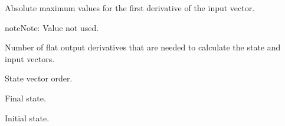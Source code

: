 \documentclass[letterpaper,10pt,english]{sphinxmanual}
\begin{document}
\begin{fulllineitems}

\begin{fulllineitems}
\label{Multi-robot motion planner:planning_sim.UnicycleKineModel.acc_max}
Absolute maximum values for the first derivative of the input vector.

\begin{notice}{note}{Note:}
Value not used.
\end{notice}

\end{fulllineitems}


\begin{fulllineitems}
\label{Multi-robot motion planner:planning_sim.UnicycleKineModel.l}
Number of flat output derivatives that are needed to calculate the state
and input vectors.

\end{fulllineitems}


\begin{fulllineitems}
\label{Multi-robot motion planner:planning_sim.UnicycleKineModel.q_dim}
State vector order.

\end{fulllineitems}


\begin{fulllineitems}
\label{Multi-robot motion planner:planning_sim.UnicycleKineModel.q_final}
Final state.

\end{fulllineitems}


\begin{fulllineitems}
\label{Multi-robot motion planner:planning_sim.UnicycleKineModel.q_init}
Initial state.

\end{fulllineitems}



\end{fulllineitems}
\end{document}
